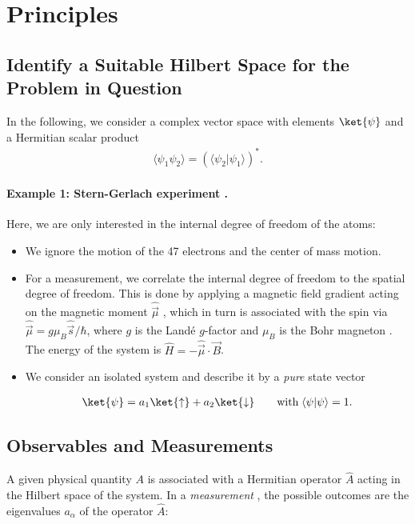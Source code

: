 \section{Principles}

\subsection{Identify a Suitable Hilbert Space for the Problem in Question}

In the following, we consider a complex vector space with elements $\ket{\psi}$ and a Hermitian scalar product
\begin{align}
				\langle\psi_1 \psi_2\rangle=(\langle{\psi_2}| \psi_1\rangle)^*.
\end{align}
\paragraph{Example 1: Stern-Gerlach experiment .}

Here, we are only interested in the internal degree of freedom of the atoms:

\begin{itemize}
						\item 	We ignore the motion of the 47 electrons and the center of mass motion.
						\item 	For a measurement, we correlate the internal degree of freedom to the spatial degree of freedom. This is done by applying a magnetic field gradient acting on the magnetic moment $\hat{\vec{\mu}}$ , which in turn is associated with the spin via $\hat{\vec{\mu}} = g \mu_B \hat{\vec{s}}/\hbar$, where $g$ is the Landé $g$-factor  and $\mu_B$ is the Bohr magneton . The energy of the system is $\hat{H} = -\hat{\vec{\mu}} \cdot \vec{B}$.
						\item 	We consider an isolated system and describe it by a \emph{pure} state vector

\begin{align}
	\ket{\psi} = a_1 \ket{\uparrow} + a_2 \ket{\downarrow}  \qquad \text{with} \; \langle\psi | \psi\rangle = 1.
\end{align}
					
\end{itemize}

\subsection{Observables and Measurements}
			A given physical quantity $A$ is associated with a Hermitian operator $\hat{A}$  acting in the Hilbert space  of the system.
						In a \emph{measurement} , the possible outcomes are the eigenvalues $a_\alpha$  of the operator $\hat{A}$:


